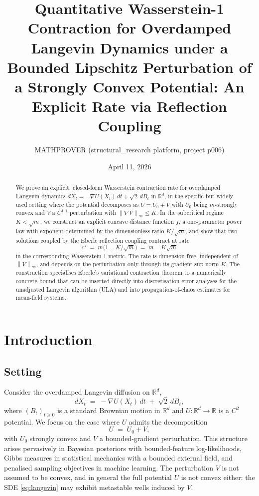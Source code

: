 \documentclass[11pt]{article}
\title{Quantitative Wasserstein-1 Contraction for Overdamped Langevin Dynamics under a Bounded Lipschitz Perturbation of a Strongly Convex Potential: An Explicit Rate via Reflection Coupling}
\author{MATHPROVER (structural\_research platform, project p006)}
\date{April 11, 2026}
\theoremstyle{definition}
\newcommand{\R}{\mathbb{R}}
\newcommand{\norm}[1]{\left\lVert #1 \right\rVert}
\begin{document}
\maketitle

\begin{abstract}
We prove an explicit, closed-form Wasserstein contraction rate for overdamped Langevin dynamics $dX_t = -\nabla U(X_t)\,dt + \sqrt{2}\,dB_t$ in $\R^d$, in the specific but widely used setting where the potential decomposes as $U = U_0 + V$ with $U_0$ being $m$-strongly convex and $V$ a $C^{1,1}$ perturbation with $\norm{\nabla V}_\infty \le K$. In the subcritical regime $K < \sqrt{m}$, we construct an explicit concave distance function $f$, a one-parameter power law with exponent determined by the dimensionless ratio $K/\sqrt m$, and show that two solutions coupled by the Eberle reflection coupling contract at rate
\[
c^\star \;=\; m\bigl(1 - K/\sqrt{m}\bigr) \;=\; m - K\sqrt{m}
\]
in the corresponding Wasserstein-$1$ metric. The rate is dimension-free, independent of $\norm{V}_\infty$, and depends on the perturbation only through its gradient sup-norm $K$. The construction specialises Eberle's variational contraction theorem \cite{Eberle2016} to a numerically concrete bound that can be inserted directly into discretisation error analyses for the unadjusted Langevin algorithm (ULA) and into propagation-of-chaos estimates for mean-field systems.
\end{abstract}

\section{Introduction}

\subsection{Setting}
Consider the overdamped Langevin diffusion on $\R^d$,
\begin{equation}\label{eq:langevin}
dX_t \;=\; -\nabla U(X_t)\,dt \;+\; \sqrt{2}\,dB_t,
\end{equation}
where $(B_t)_{t\ge 0}$ is a standard Brownian motion in $\R^d$ and $U: \R^d \to \R$ is a $C^2$ potential. We focus on the case where $U$ admits the decomposition
\begin{equation}\label{eq:decomposition}
U \;=\; U_0 + V,
\end{equation}
with $U_0$ strongly convex and $V$ a bounded-gradient perturbation. This structure arises pervasively in Bayesian posteriors with bounded-feature log-likelihoods, Gibbs measures in statistical mechanics with a bounded external field, and penalised sampling objectives in machine learning. The perturbation $V$ is not assumed to be convex, and in general the full potential $U$ is not convex either: the SDE \eqref{eq:langevin} may exhibit metastable wells induced by $V$.
\end{document}
